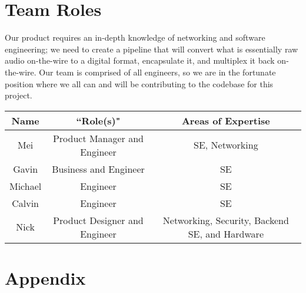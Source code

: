 \documentclass[10pt]{article}
\begin{document}
\section{Team Roles}
Our product requires an in-depth knowledge of networking and software
engineering; we need to create a pipeline that will convert what is essentially
raw audio on-the-wire to a digital format, encapsulate it, and multiplex it back
on-the-wire.  Our team is comprised of all engineers, so we are in the fortunate
position where we all can and will be contributing to the codebase for this
project.

\begin{center}
    \begin{tabular}{ c | c | c }
        \textbf{Name} & \textbf{``Role(s)"} & \textbf{Areas of Expertise}\\
        \hline
        Mei & Product Manager and Engineer & SE, Networking\\
        Gavin & Business and Engineer & SE\\
        Michael & Engineer & SE\\
        Calvin & Engineer & SE\\
        Nick & Product Designer and Engineer & Networking, Security, Backend SE, and Hardware\\
    \end{tabular}
\end{center}

\section{Appendix}
\end{document}
